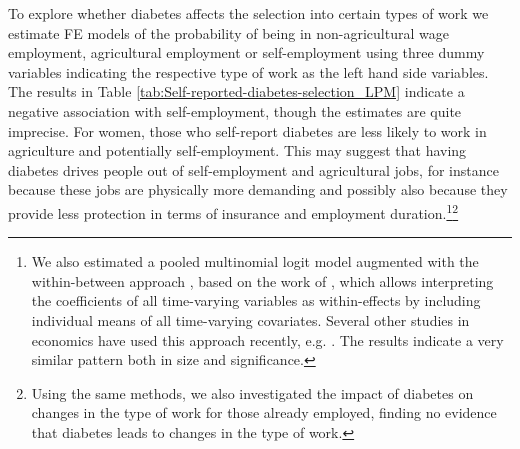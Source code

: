 To explore whether diabetes affects the selection into certain types of work we estimate \ac{FE} models of the probability of being in non-agricultural wage employment, agricultural employment or self-employment using three dummy variables indicating the respective type of work as the left hand side variables. The results in Table \ref{tab:Self-reported-diabetes-selection_LPM} indicate a negative association with self-employment, though the estimates are quite imprecise. For women, those who self-report diabetes are less likely to work in agriculture and potentially self-employment. This may suggest that having diabetes drives people out of self-employment and agricultural jobs, for instance because these jobs are physically more demanding and possibly also because they provide less protection in terms of insurance and employment duration.\footnote{We also estimated a pooled multinomial logit model augmented  with the within-between approach \parencite{Bell2015}, based on the work of \textcite{Mundlak1978}, which allows interpreting the coefficients of all time-varying variables as within-effects by including individual means of all time-varying covariates. Several other studies in economics have used this approach recently, e.g. \DIFdelbegin \DIFdel{, }\DIFdelend \textcite{Geishecker2011,Wunder2014,Boll2016}. The results indicate a very similar pattern both in size and significance.}\footnote{Using the same methods, we also investigated the impact of diabetes on changes in the type of work for those already employed, finding no evidence that diabetes leads to changes in the type of work.}


